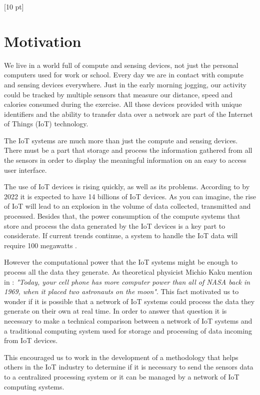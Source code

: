 \titleformat{\chapter}{\Huge\bfseries}{\thechapter}{0 pt}{\rule{340 pt}{3 pt}\\}
\titlespacing{\chapter}{100 pt}{-25 pt}{40 pt}[10 pt]	
\pagestyle{fancy}
\fancyhead[RO,RE]{\thepage}
\fancyfoot[CO,CE]{}

\chapter*{Motivation}

\normalsize
\noindent

We live in a world full of compute and sensing devices, not just the personal
computers used for work or school. Every day we are in contact with compute and
sensing devices everywhere. Just in the early morning jogging, our activity
could be tracked by multiple sensors that measure our distance, speed and
calories consumed during the exercise. All these devices provided with unique
identifiers and the ability to transfer data over a network are part of the
Internet of Things (IoT) technology. 

The IoT systems are much more than just the compute and sensing devices. There
must be a part that storage and process the information gathered from all the
sensors  in order to display the meaningful information on an easy to access
user interface. 

The use of IoT devices is rising quickly, as well as its problems. According to
\cite{Benkhelifa} by 2022 it is expected to have 14 billions of IoT devices. As
you can imagine, the rise of IoT will lead to an explosion in the volume of
data collected, transmitted and processed. Besides that, the power consumption
of the compute systems that store and process the data generated by the IoT
devices is a key part to considerate. If current trends continue, a system to
handle the IoT data will require 100 megawatts \cite{Xizhou}.

However the computational power that the IoT systems might be enough to
process all the data they generate. As  theoretical physicist Michio Kaku
mention in \cite{Michio}: \textit{"Today, your cell phone has more computer
power than all of NASA back in 1969, when it placed two astronauts on the
moon"}. This fact motivated us to wonder if it is possible that a network of IoT
systems could process the data they generate on their own at real time. In
order to answer that question it is necessary to make a technical comparison
between a network of IoT systems and a traditional computing system used for
storage and processing of data incoming from IoT devices. 

This encouraged us to work in the development of a
methodology that helps others in the IoT industry to determine if it is
necessary to send the sensors data to a centralized processing system or it can
be managed by a network of IoT computing systems. 

\clearpage
